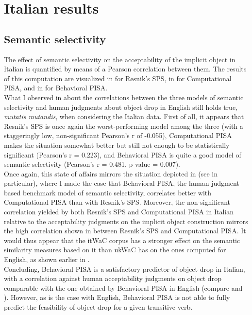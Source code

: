 \section{Italian results} 

\subsection{Semantic selectivity} 

The effect of semantic selectivity on the acceptability of the implicit object in Italian is quantified by means of a Pearson correlation between them. The results of this computation are visualized in  for Resnik's SPS, in  for Computational PISA, and in  for Behavioral PISA.\\
What I observed in  about the correlations between the three models of semantic selectivity and human judgments about object drop in English still holds true, \textit{mutatis mutandis}, when considering the Italian data. First of all, it appears that Resnik's SPS is once again the worst-performing model among the three (with a staggeringly low, non-significant Pearson's r of -0.055), Computational PISA makes the situation somewhat better but still not enough to be statistically significant (Pearson's r = 0.223), and Behavioral PISA is quite a good model of semantic selectivity (Pearson's r = 0.481, p value = 0.007).\\
Once again, this state of affairs mirrors the situation depicted in  (see  in particular), where I made the case that Behavioral PISA, the human judgment-based benchmark model of semantic selectivity, correlates better with Computational PISA than with Resnik's SPS. Moreover, the non-significant correlation yielded by both Resnik's SPS and Computational PISA in Italian relative to the acceptability judgments on the implicit object construction mirrors the high correlation shown in  between Resnik's SPS and Computational PISA. It would thus appear that the itWaC corpus has a stronger effect on the semantic similarity measures based on it than ukWaC has on the ones computed for English, as shown earlier in .\\
Concluding, Behavioral PISA is a satisfactory predictor of object drop in Italian, with a correlation against human acceptability judgments on object drop comparable with the one obtained by Behavioral PISA in English (compare  and ). However, as is the case with English, Behavioral PISA is not able to fully predict the feasibility of object drop for a given transitive verb.

